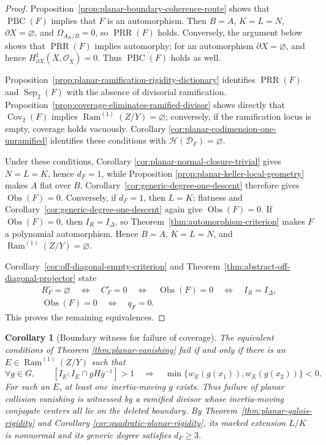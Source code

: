 \documentclass[11pt]{article}
\newtheorem{corollary}[theorem]{Corollary}
\theoremstyle{remark}
\theoremstyle{definition}
\DeclareMathOperator{\Ram}{Ram}
\newcommand{\Obs}{\operatorname{Obs}}
\begin{document}
\begin{proof}
Proposition~\ref{prop:planar-boundary-coherence-route} shows that
\(\operatorname{PBC}(F)\) implies that \(F\) is an automorphism.  Then
\(B=A\), \(K=L=N\), \(\partial X=\varnothing\), and
\(\Omega_{A_N/B}=0\), so \(\operatorname{PRR}(F)\) holds.  Conversely,
the argument below shows that \(\operatorname{PRR}(F)\) implies
automorphy; for an automorphism \(\partial X=\varnothing\), and hence
\(H^1_{\partial X}(\overline X,\mathcal O_{\overline X})=0\).  Thus
\(\operatorname{PBC}(F)\) holds as well.

Proposition~\ref{prop:planar-ramification-rigidity-dictionary} identifies
\(\operatorname{PRR}(F)\) and \(\operatorname{Sep}_2(F)\) with the absence
of divisorial ramification.
Proposition~\ref{prop:coverage-eliminates-ramified-divisor} shows directly
that \(\operatorname{Cov}_2(F)\) implies
\(\Ram^{(1)}(Z/Y)=\varnothing\); conversely, if the ramification locus is
empty, coverage holds vacuously.  Corollary
\ref{cor:planar-codimension-one-unramified} identifies these conditions with
\(\mathcal H(\mathcal D_F)=\varnothing\).

Under these conditions, Corollary
\ref{cor:planar-normal-closure-trivial} gives \(N=L=K\), hence \(d_F=1\),
while Proposition
\ref{prop:planar-keller-local-geometry} makes \(A\) flat over \(B\).
Corollary~\ref{cor:generic-degree-one-descent} therefore gives
\(\Obs(F)=0\).  Conversely, if \(d_F=1\), then \(L=K\); flatness and
Corollary~\ref{cor:generic-degree-one-descent} again give \(\Obs(F)=0\).
If \(\Obs(F)=0\), then \(I_R=I_\Delta\), so
Theorem~\ref{thm:automorphism-criterion} makes \(F\) a polynomial
automorphism.  Hence \(B=A\), \(K=L=N\), and
\(\Ram^{(1)}(Z/Y)=\varnothing\).

Corollary~\ref{cor:off-diagonal-empty-criterion} and
Theorem~\ref{thm:abstract-off-diagonal-projector} state
\[
  \begin{gathered}
    R_F^\circ=\varnothing
    \quad\Longleftrightarrow\quad
    C_F^\circ=0
    \quad\Longleftrightarrow\quad
    \Obs(F)=0
    \quad\Longleftrightarrow\quad
    I_R=I_\Delta,\\
    \Obs(F)=0
    \quad\Longleftrightarrow\quad
    q_F=0.
  \end{gathered}
\]
This proves the remaining equivalences.
\end{proof}

\begin{corollary}[Boundary witness for failure of coverage]
\label{cor:planar-boundary-witness}
The equivalent conditions of Theorem
\ref{thm:planar-vanishing} fail if and only if there is an
\(E\in\Ram^{(1)}(Z/Y)\) such that
\[
  \forall g\in G,\qquad
  [I_E:I_E\cap gHg^{-1}]>1
  \quad\Longrightarrow\quad
  \min\{w_E(g(x_1)),w_E(g(x_2))\}<0.
\]
For such an \(E\), at least one inertia-moving \(g\) exists.  Thus failure of
planar collision vanishing is witnessed by a ramified divisor whose
inertia-moving conjugate centers all lie on the deleted boundary.  By
Theorem~\ref{thm:planar-galois-rigidity} and Corollary
\ref{cor:quadratic-planar-rigidity}, its marked extension \(L/K\) is
nonnormal and its generic degree satisfies \(d_F\geq3\).
\end{corollary}
\end{document}
